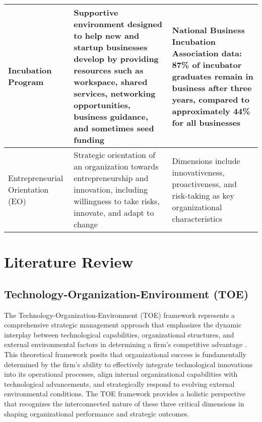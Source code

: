 \documentclass[../Main.tex]{subfiles}
\begin{document}
\begin{table}[h]
\begin{tabular}{|p{2.5cm}|p{6cm}|p{5cm}|}
\hline
Incubation Program & Supportive environment designed to help new and startup businesses develop by providing resources such as workspace, shared services, networking opportunities, business guidance, and sometimes seed funding \cite{hackett2004business,europeancommission2014incubators} & National Business Incubation Association data: 87\% of incubator graduates remain in business after three years, compared to approximately 44\% for all businesses \cite{NBIA2012} \\
\hline
Entrepreneurial Orientation (EO) & Strategic orientation of an organization towards entrepreneurship and innovation, including willingness to take risks, innovate, and adapt to change \cite{wiklund2005entrepreneurial} & Dimensions include innovativeness, proactiveness, and risk-taking as key organizational characteristics \\
\hline
\end{tabular}
\end{table}

\section{Literature Review}
\subsection{Technology-Organization-Environment (TOE)}

The Technology-Organization-Environment (TOE) framework represents a comprehensive strategic management approach that emphasizes the dynamic interplay between technological capabilities, organizational structures, and external environmental factors in determining a firm's competitive advantage \cite{toer}. This theoretical framework posits that organizational success is fundamentally determined by the firm's ability to effectively integrate technological innovations into its operational processes, align internal organizational capabilities with technological advancements, and strategically respond to evolving external environmental conditions. The TOE framework provides a holistic perspective that recognizes the interconnected nature of these three critical dimensions in shaping organizational performance and strategic outcomes.
\end{document}
